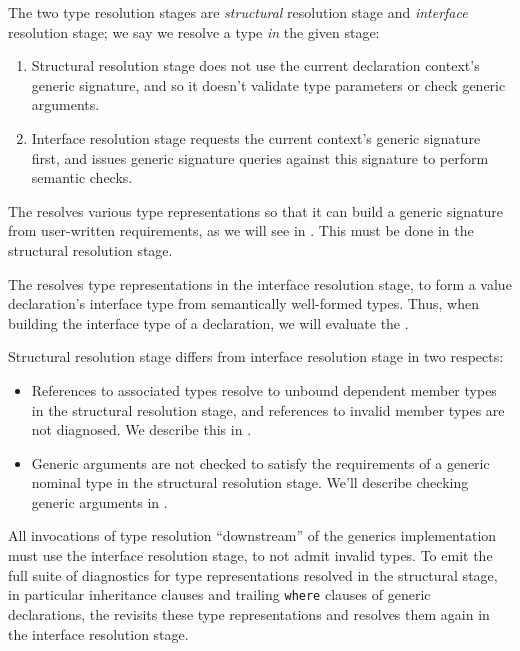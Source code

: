 \documentclass[../generics]{subfiles}
\begin{document}
The two type resolution stages are \emph{structural} resolution stage and \emph{interface} resolution stage; we say we resolve a type \emph{in} the given stage:
\begin{enumerate}
\item {}Structural resolution stage does not use the current declaration context's generic signature, and so it doesn't validate type parameters or check generic arguments.

\item {}Interface resolution stage requests the current context's generic signature first, and issues generic signature queries against this signature to perform semantic checks.
\end{enumerate}

The  resolves various type representations so that it can build a generic signature from user-written requirements, as we will see in . This must be done in the structural resolution stage.

The  resolves type representations in the interface resolution stage, to form a value declaration's interface type from semantically well-formed types. Thus, when building the interface type of a declaration, we will evaluate the .

Structural resolution stage differs from interface resolution stage in two respects:
\begin{itemize}
\item References to associated types resolve to unbound dependent member types in the structural resolution stage, and references to invalid member types are not diagnosed. We describe this in .
\item Generic arguments are not checked to satisfy the requirements of a generic nominal type in the structural resolution stage. We'll describe checking generic arguments in .
\end{itemize}

All invocations of type resolution ``downstream'' of the generics implementation must use the interface resolution stage, to not admit invalid types. To emit the full suite of diagnostics for type representations resolved in the structural stage, in particular inheritance clauses and trailing \texttt{where} clauses of generic declarations, the  revisits these type representations and resolves them again in the interface resolution stage.
\end{document}
